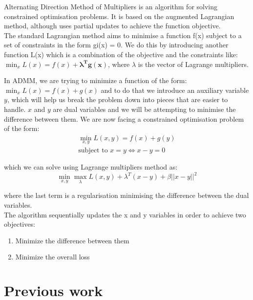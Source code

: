 \documentclass[letterpaper]{article}
\begin{document}
Alternating Direction Method of Multipliers is an algorithm for solving constrained optimisation problems. It is based on the augmented Lagrangian method, although uses partial updates to achieve the function objective. \\
The standard Lagrangian method aims to minimise a function f(x) subject to a set of constraints in the form gi(x) = 0. We do this by introducing another function L(x) which is a combination of the objective and the constraints like: $\min_{x} L(x) = f(x) + \boldsymbol{\lambda^T g(x)}$, where $\lambda$ is the vector of Lagrange multipliers.

In ADMM, we are trying to minimize a function of the form: $\min_{x} L(x) = f(x) + g(x)$ and to do that we introduce an auxiliary variable $y$, which will help us break the problem down into pieces that are easier to handle. $x$ and $y$ are dual variables and we will be attempting to minimise the difference between them. We are now facing a constrained optimisation problem of the form:
\begin{align}
\min_{x,y} L(x,y) = f(x) + g(y) \\
\textrm{subject to } x = y \Leftrightarrow x-y=0
\end{align}

which we can solve using Lagrange multipliers method as:
\begin{equation}
\label{ADMM_equation}
\min_{x,y} \max_{\lambda} L(x,y) + \lambda^T (x-y) + \beta ||x-y||^2
\end{equation}

where the last term is a regularisation minimising the difference between the dual variables.\\
The algorithm sequentially updates the x and y variables in order to achieve two objectives:
\begin{enumerate}
	\item Minimize the difference between them
	\item Minimize the overall loss
\end{enumerate}

\section{Previous work}
\end{document}

